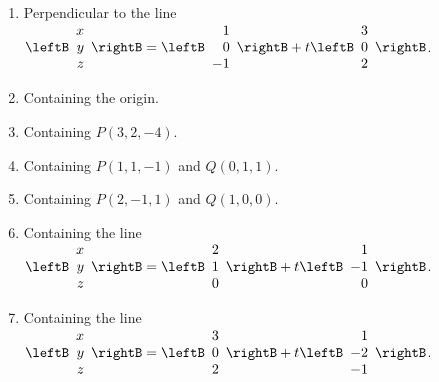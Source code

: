 \begin{multicols}{2}
\begin{ex}
\begin{enumerate}[label={\alph*.}]
\item Perpendicular to the line  \\
$\leftB
\begin{array}{r}
x\\
y\\
z
\end{array}
\rightB
=
\leftB
\begin{array}{r}
1\\
0\\
-1
\end{array}
\rightB
+t
\leftB
\begin{array}{r}
3\\
0\\
2
\end{array}
\rightB$.

\item Containing the origin.

\item Containing $P(3, 2, -4)$.

\item Containing $P(1, 1, -1)$ and $Q(0, 1, 1)$.

\item Containing $P(2, -1, 1)$ and $Q(1, 0, 0)$.

\item Containing the line \\
$\leftB
\begin{array}{r}
x\\
y\\
z
\end{array}
\rightB
=
\leftB
\begin{array}{r}
2\\
1\\
0
\end{array}
\rightB
+t
\leftB
\begin{array}{r}
1\\
-1\\
0
\end{array}
\rightB$.

\item Containing the line \\
$\leftB
\begin{array}{r}
x\\
y\\
z
\end{array}
\rightB
=
\leftB
\begin{array}{r}
3\\
0\\
2
\end{array}
\rightB
+t
\leftB
\begin{array}{r}
1\\
-2\\
-1
\end{array}
\rightB$.


\end{enumerate}
\end{ex}
\end{multicols}
